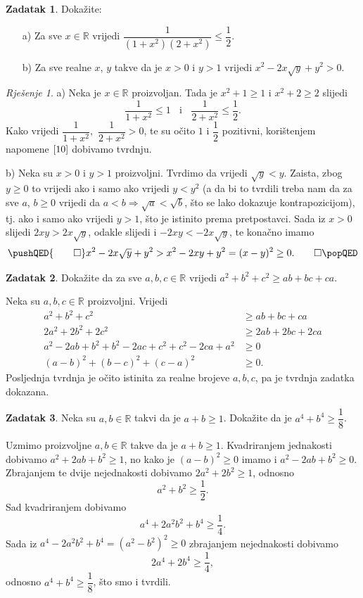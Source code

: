 \documentclass{book}
\renewenvironment{proof}{%
    \vspace{-\parskip}\begin{oldproof}%
    }{%
    \end{oldproof}%
}
\theoremstyle{definition}
\theoremstyle{definition}
\newtheorem{exercise}{Zadatak}
\theoremstyle{remark}
\newtheorem*{proof*}{Rješenje}
\begin{document}
\begin{exercise}
Dokažite:
\begin{itemize}
\item[a)] Za sve $x\in \mathbb{R}$ vrijedi $\dfrac{1}{(1+x^2)(2+x^2)}\leq \dfrac{1}{2}$.
\item[b)] Za sve realne $x$, $y$ takve da je $x>0$ i $y>1$ vrijedi $x^2-2x\sqrt{y}+y^2> 0$.
\end{itemize}
\end{exercise}
\begin{proof*}
a) Neka je $x\in \mathbb{R}$ proizvoljan. Tada je $x^2+1\geq 1$ i $x^2+2\geq 2$ slijedi $$\dfrac{1}{1+x^2}\leq 1 \;\; \text{ i }\;\;\dfrac{1}{2+x^2}\leq \dfrac{1}{2}.$$ Kako vrijedi $\dfrac{1}{1+x^2},$ $\dfrac{1}{2+x^2}>0$, te su očito $1$ i $\dfrac{1}{2}$ pozitivni, korištenjem napomene $\ref{10}$ dobivamo tvrdnju.

b) Neka su $x>0$ i $y>1$ proizvoljni. Tvrdimo da vrijedi $\sqrt{y}< y$. Zaista, zbog $y\geq 0$ to vrijedi ako i samo ako vrijedi $y<y^2$ (a da bi to tvrdili treba nam da za sve $a$, $b\geq 0$ vrijedi da $a<b\Rightarrow \sqrt{a}<\sqrt{b}$, što se lako dokazuje kontrapozicijom), tj. ako i samo ako vrijedi $y>1$, što je istinito prema pretpostavci. Sada iz $x>0$ slijedi $2xy>2x\sqrt{y}$, odakle slijedi i $-2xy<-2x\sqrt{y}$, te konačno imamo
\[
\pushQED{\qed}
x^2-2x\sqrt{y}+y^2>x^2-2xy+y^2=(x-y)^2\geq 0.\qedhere
\popQED
\]
\end{proof*}
\begin{exercise}
Dokažite da za sve $a, b, c\in \mathbb{R}$ vrijedi $a^2+b^2+c^2\geq ab+bc+ca$.
\end{exercise}
\begin{proof}[Rješenje]
Neka su $a, b, c\in \mathbb{R}$ proizvoljni. Vrijedi
\begin{align*}
a^2+b^2+c^2&\geq ab+bc+ca\\
2a^2+2b^2+2c^2&\geq 2ab+2bc+2ca\\
a^2-2ab+b^2+b^2-2ac+c^2+c^2-2ca+a^2&\geq 0\\
(a-b)^2+(b-c)^2+(c-a)^2&\geq 0.
\end{align*}
Posljednja tvrdnja je očito istinita za realne brojeve $a, b, c$, pa je tvrdnja zadatka dokazana.
\end{proof}
\begin{exercise}
Neka su $a, b\in \mathbb{R}$ takvi da je $a+b\geq 1$. Dokažite da je $a^4+b^4\geq \dfrac{1}{8}$.
\end{exercise}
\begin{proof}[Rješenje]
Uzmimo proizvoljne $a, b\in \mathbb{R}$ takve da je $a+b\geq 1$. Kvadriranjem jednakosti dobivamo $a^2+2ab+b^2\geq 1$, no kako je $(a-b)^2\geq 0$ imamo i $a^2-2ab+b^2\geq 0$. Zbrajanjem te dvije nejednakosti dobivamo $2a^2+2b^2\geq 1$, odnosno $$a^2+b^2\geq \dfrac{1}{2}.$$ Sad kvadriranjem dobivamo $$a^4+2a^2b^2+b^4\geq \dfrac{1}{4}.$$ Sada iz $a^4-2a^2b^2+b^4=(a^2-b^2)^2\geq 0$ zbrajanjem nejednakosti dobivamo $$2a^4+2b^4\geq \dfrac{1}{4},$$ odnosno $a^4+b^4\geq \dfrac{1}{8}$, što smo i tvrdili.
\end{proof}
\end{document}
